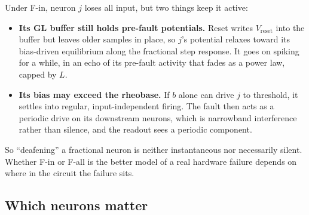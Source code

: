 \documentclass[11pt,a4paper]{article}
\begin{document}
Under F-in, neuron $j$ loses all input, but two things keep it active:
\begin{itemize}
  \item \textbf{Its GL buffer still holds pre-fault potentials.} Reset writes $V_{\mathrm{reset}}$ into the buffer but leaves older samples in place, so $j$'s potential relaxes toward its bias-driven equilibrium along the fractional step response. It goes on spiking for a while, in an echo of its pre-fault activity that fades as a power law, capped by $L$.
  \item \textbf{Its bias may exceed the rheobase.} If $b$ alone can drive $j$ to threshold, it settles into regular, input-independent firing. The fault then acts as a periodic drive on its downstream neurons, which is narrowband interference rather than silence, and the readout sees a periodic component.
\end{itemize}
So ``deafening'' a fractional neuron is neither instantaneous nor necessarily silent. Whether F-in or F-all is the better model of a real hardware failure depends on where in the circuit the failure sits.

\subsection{Which neurons matter}
\end{document}
